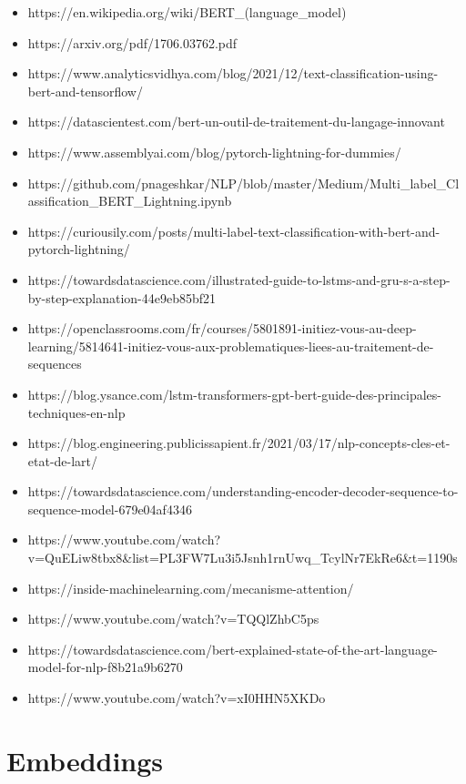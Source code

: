 \documentclass[8pt]{article}
\begin{document}
\begin{itemize}
 \item https://en.wikipedia.org/wiki/BERT\_(language\_model)
 \item https://arxiv.org/pdf/1706.03762.pdf
 \item https://www.analyticsvidhya.com/blog/2021/12/text-classification-using-bert-and-tensorflow/
 \item https://datascientest.com/bert-un-outil-de-traitement-du-langage-innovant
 \item https://www.assemblyai.com/blog/pytorch-lightning-for-dummies/ 
 \item https://github.com/pnageshkar/NLP/blob/master/Medium/Multi\_label\_Classification\_BERT\_Lightning.ipynb
 \item https://curiousily.com/posts/multi-label-text-classification-with-bert-and-pytorch-lightning/
 \item https://towardsdatascience.com/illustrated-guide-to-lstms-and-gru-s-a-step-by-step-explanation-44e9eb85bf21
 \item https://openclassrooms.com/fr/courses/5801891-initiez-vous-au-deep-learning/5814641-initiez-vous-aux-problematiques-liees-au-traitement-de-sequences
 \item https://blog.ysance.com/lstm-transformers-gpt-bert-guide-des-principales-techniques-en-nlp
 \item https://blog.engineering.publicissapient.fr/2021/03/17/nlp-concepts-cles-et-etat-de-lart/
 \item https://towardsdatascience.com/understanding-encoder-decoder-sequence-to-sequence-model-679e04af4346
 \item https://www.youtube.com/watch?v=QuELiw8tbx8\&list=PL3FW7Lu3i5Jsnh1rnUwq\_TcylNr7EkRe6\&t=1190s
 \item https://inside-machinelearning.com/mecanisme-attention/
 \item https://www.youtube.com/watch?v=TQQlZhbC5ps
 \item https://towardsdatascience.com/bert-explained-state-of-the-art-language-model-for-nlp-f8b21a9b6270
 \item https://www.youtube.com/watch?v=xI0HHN5XKDo
\end{itemize}

    \hypertarget{embeddings}{%
\section{Embeddings}\label{embeddings}}
\end{document}
